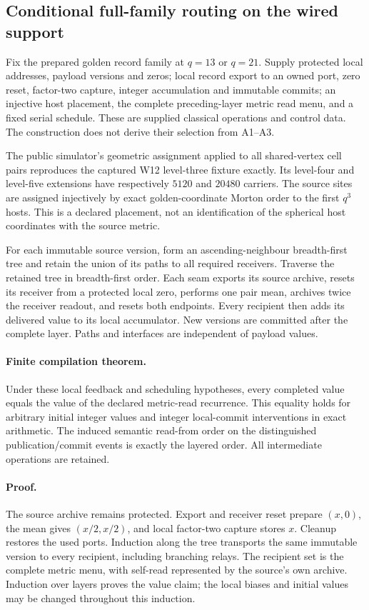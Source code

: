 \subsection{Conditional full-family routing on the wired support}
\label{sec:source-read-routing}

Fix the prepared golden record family at $q=13$ or $q=21$. Supply
protected local addresses, payload versions and zeros;
local record export to an owned port, zero reset, factor-two capture,
integer accumulation and immutable commits; an injective host placement,
the complete preceding-layer metric read menu, and a fixed serial schedule.
These are supplied classical operations and control data.  The construction
does not derive their selection from A1--A3.

The public simulator's geometric assignment applied to all shared-vertex
cell pairs reproduces the captured W12 level-three fixture exactly.  Its
level-four and level-five extensions have respectively $5120$ and $20480$
carriers.  The source sites are assigned injectively by exact golden-coordinate
Morton order to the first $q^3$ hosts.  This is a declared placement, not an
identification of the spherical host coordinates with the source metric.

For each immutable source version, form an ascending-neighbour breadth-first
tree and retain the union of its paths to all required receivers.  Traverse
the retained tree in breadth-first order.  Each seam exports its source
archive, resets its receiver from a protected local zero, performs one pair
mean, archives twice the receiver readout, and resets both endpoints.  Every
recipient then adds its delivered value to its local accumulator.  New
versions are committed after the complete layer.  Paths and interfaces are
independent of payload values.

\paragraph{Finite compilation theorem.}
Under these local feedback and scheduling hypotheses, every completed value equals the value of the declared metric-read
recurrence.  This equality holds for arbitrary initial integer values and
integer local-commit interventions in exact arithmetic.  The induced
semantic read-from order on the distinguished publication/commit events is
exactly the layered order.  All intermediate operations are retained.

\paragraph{Proof.}
The source archive remains protected.  Export and receiver reset prepare
$(x,0)$, the mean gives $(x/2,x/2)$, and local factor-two capture stores $x$.
Cleanup restores the used ports.  Induction along the tree transports the
same immutable version to every recipient, including branching relays.
The recipient set is the complete metric menu, with self-read represented
by the source's own archive.  Induction over layers proves the value claim;
the local biases and initial values may be changed throughout this induction.

